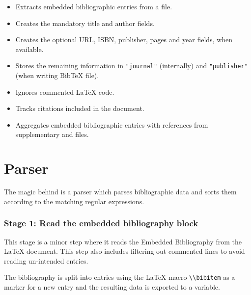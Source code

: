 \begin{itemize}
  \item Extracts embedded bibliographic entries from a  file.
  \item Creates the mandatory title and author fields.
  \item Creates the optional URL, ISBN, publisher, pages and year fields, when available.
  \item Stores the remaining information in \verb|"journal"| (internally) and \verb|"publisher"| (when writing BibTeX file).
  \item Ignores commented LaTeX code. 
  \item Tracks citations included in the document.
  \item Aggregates embedded bibliographic entries with references from supplementary  and  files.
\end{itemize}

\section{Parser}

The magic behind  is a parser which parses bibliographic data and sorts them according to the matching regular expressions.

\subsubsection{Stage 1: Read the embedded bibliography block}

This stage is a minor step where it reads the Embedded Bibliography from the LaTeX document. This step also includes filtering out commented lines to avoid reading un-intended entries.

The bibliography is split into entries using the LaTeX macro \verb|\\bibitem| as a marker for a new entry and the resulting data is exported to a variable.


